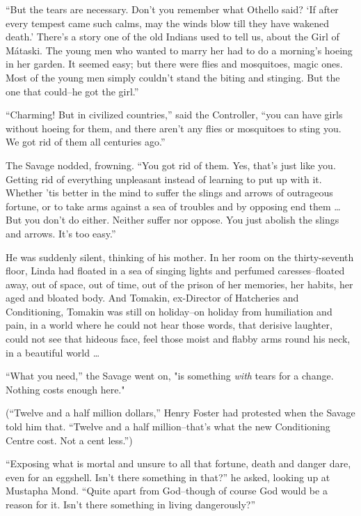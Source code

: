\documentclass[12pt]{report}
\begin{document}
``But the tears are necessary. Don't you remember what Othello said? `If
after every tempest came such calms, may the winds blow till they have
wakened death.' There's a story one of the old Indians used to tell us,
about the Girl of Mátaski. The young men who wanted to marry her had to
do a morning's hoeing in her garden. It seemed easy; but there were
flies and mosquitoes, magic ones. Most of the young men simply couldn't
stand the biting and stinging. But the one that could--he got the
girl.''

``Charming! But in civilized countries,'' said the Controller, ``you can
have girls without hoeing for them, and there aren't any flies or
mosquitoes to sting you. We got rid of them all centuries ago.''

The Savage nodded, frowning. ``You got rid of them. Yes, that's just
like you. Getting rid of everything unpleasant instead of learning to
put up with it. Whether 'tis better in the mind to suffer the slings and
arrows of outrageous fortune, or to take arms against a sea of troubles
and by opposing end them \ldots{} But you don't do either. Neither
suffer nor oppose. You just abolish the slings and arrows. It's too
easy.''

He was suddenly silent, thinking of his mother. In her room on the
thirty-seventh floor, Linda had floated in a sea of singing lights and
perfumed caresses--floated away, out of space, out of time, out of the
prison of her memories, her habits, her aged and bloated body. And
Tomakin, ex-Director of Hatcheries and Conditioning, Tomakin was still
on holiday--on holiday from humiliation and pain, in a world where he
could not hear those words, that derisive laughter, could not see that
hideous face, feel those moist and flabby arms round his neck, in a
beautiful world \ldots{}

``What you need,'' the Savage went on, "is something \emph{with} tears
for a change. Nothing costs enough here."

(``Twelve and a half million dollars,'' Henry Foster had protested when
the Savage told him that. ``Twelve and a half million--that's what the
new Conditioning Centre cost. Not a cent less.'')

``Exposing what is mortal and unsure to all that fortune, death and
danger dare, even for an eggshell. Isn't there something in that?'' he
asked, looking up at Mustapha Mond. ``Quite apart from God--though of
course God would be a reason for it. Isn't there something in living
dangerously?''
\end{document}

